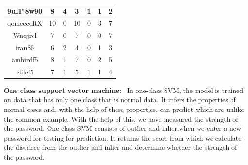 \documentclass[runningheads]{llncs}
\begin{document}
{\begin{table}[htb]
{\begin{tabular}{||c||c||c||c||c||c||c||}
 9uH"8w90 &8 & 4&3&1&1&2\\
 \hline
 qomeccdltX & 10 & 0&10&0&3&7\\
 \hline
 Wnqjrcl & 7 & 0&7&0&0&7\\
 \hline
 iran85 & 6 & 2&4&0&1&3\\
\hline
ambirdf5 & 8 & 1&7&0&2&5\\
\hline
clile!5 & 7 & 1&5&1&1&4\\

    \hline
    \hline
\end{tabular}
}
\end{table}
}

\newline
\hfill \break
\newline
\textbf{One class support vector machine:}
{~In one-class SVM, the model is trained on data that has only one class that is normal data. It infers the properties of normal cases and, with the help of these properties, can predict which are unlike the common example. With the help of this, we have measured the strength of the password. One class SVM consists of outlier and inlier.when we enter a new password for testing for prediction. It returns the score from which we calculate the distance from the outlier and inlier and determine whether the strength of the password.\\
\hfill \break
}
\end{document}
